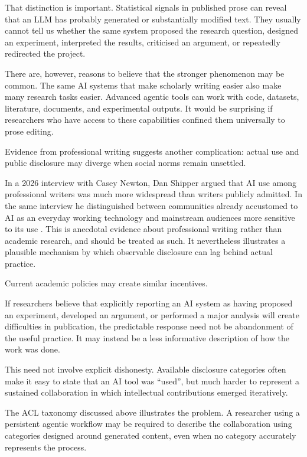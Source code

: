That distinction is important. Statistical signals in published prose can reveal that an LLM has probably generated or substantially modified text. They usually cannot tell us whether the same system proposed the research question, designed an experiment, interpreted the results, criticised an argument, or repeatedly redirected the project.

There are, however, reasons to believe that the stronger phenomenon may be common. The same AI systems that make scholarly writing easier also make many research tasks easier. Advanced agentic tools can work with code, datasets, literature, documents, and experimental outputs. It would be surprising if researchers who have access to these capabilities confined them universally to prose editing.

Evidence from professional writing suggests another complication: actual use and public disclosure may diverge when social norms remain unsettled.

In a 2026 interview with Casey Newton, Dan Shipper argued that AI use among professional writers was much more widespread than writers publicly admitted. In the same interview he distinguished between communities already accustomed to AI as an everyday working technology and mainstream audiences more sensitive to its use \citep{newton2026editorclone}. This is anecdotal evidence about professional writing rather than academic research, and should be treated as such. It nevertheless illustrates a plausible mechanism by which observable disclosure can lag behind actual practice.

Current academic policies may create similar incentives.

If researchers believe that explicitly reporting an AI system as having proposed an experiment, developed an argument, or performed a major analysis will create difficulties in publication, the predictable response need not be abandonment of the useful practice. It may instead be a less informative description of how the work was done.

This need not involve explicit dishonesty. Available disclosure categories often make it easy to state that an AI tool was ``used'', but much harder to represent a sustained collaboration in which intellectual contributions emerged iteratively.

The ACL taxonomy discussed above illustrates the problem. A researcher using a persistent agentic workflow may be required to describe the collaboration using categories designed around generated content, even when no category accurately represents the process.

